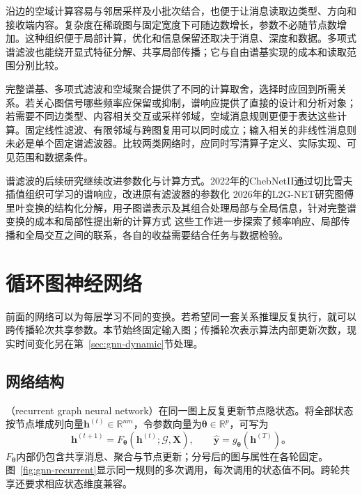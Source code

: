沿边的空域计算容易与邻居采样及小批次结合，也便于让消息读取边类型、方向和接收端内容。复杂度在稀疏图与固定宽度下可随边数增长，参数不必随节点数增加。这种组织便于局部计算，优化和信息保留还取决于消息、深度和数据。多项式谱滤波也能绕开显式特征分解、共享局部传播；它与自由谱基实现的成本和读取范围分别比较。

完整谱基、多项式滤波和空域聚合提供了不同的计算取舍，选择时应回到所需关系。若关心图信号哪些频率应保留或抑制，谱响应提供了直接的设计和分析对象；若需要不同边类型、内容相关交互或采样邻域，空域消息规则更便于表达这些计算。固定线性滤波、有限邻域与跨图复用可以同时成立；输入相关的非线性消息则未必是单个固定谱滤波器。比较两类网络时，应同时写清算子定义、实际实现、可见范围和数据条件。

谱滤波的后续研究继续改进参数化与计算方式。2022年的ChebNetII通过切比雪夫插值组织可学习的谱响应，改进原有滤波器的参数化 2026年的L2G-NET研究图傅里叶变换的结构化分解，用子图谱表示及其组合处理局部与全局信息，针对完整谱变换的成本和局部性提出新的计算方式 这些工作进一步探索了频率响应、局部传播和全局交互之间的联系，各自的收益需要结合任务与数据检验。

\section{循环图神经网络}
\label{sec:gnn-recurrent}

前面的网络可以为每层学习不同的变换。若希望同一套关系推理反复执行，就可以跨传播轮次共享参数。本节始终固定输入图；传播轮次表示算法内部更新次数，现实时间变化另在第~\ref{sec:gnn-dynamic}节处理。

\subsection{网络结构}
\label{sec:gnn-recurrent-structure}

（recurrent graph neural network）在同一图上反复更新节点隐状态。将全部状态按节点堆成列向量$\bm{h}^{(t)}\in\mathbb{R}^{nm}$，令参数向量为$\bm{\theta}\in\mathbb{R}^{p}$，可写为
\begin{equation}
  \bm{h}^{(t+1)}=F_{\bm{\theta}}(\bm{h}^{(t)};\mathcal{G},\bm{X}),
  \qquad \widehat{\bm{y}}=g_{\bm{\theta}}(\bm{h}^{(T)})\text{。}
  \label{eq:gnn-recurrent-update}
\end{equation}
$F_{\bm{\theta}}$内部仍包含共享消息、聚合与节点更新；分号后的图与属性在各轮固定。图~\ref{fig:gnn-recurrent}显示同一规则的多次调用，每次调用的状态值不同。跨轮共享还要求相应状态维度兼容。

